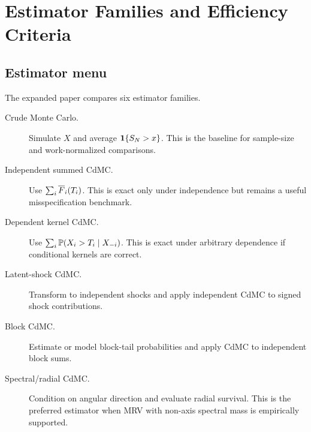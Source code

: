 \section{Estimator Families and Efficiency Criteria}
\label{sec:estimators-efficiency}

\subsection{Estimator menu}

The expanded paper compares six estimator families.

\begin{description}
\item[Crude Monte Carlo.] Simulate \(X\) and average \(\mathbf{1}\{S_N>x\}\). This is
the baseline for sample-size and work-normalized comparisons.

\item[Independent summed CdMC.] Use \(\sum_i\overline{F}_i(T_i)\). This is exact only
under independence but remains a useful misspecification benchmark.

\item[Dependent kernel CdMC.] Use \(\sum_i\mathbb{P}(X_i>T_i\mid X_{-i})\). This is
exact under arbitrary dependence if conditional kernels are correct.

\item[Latent-shock CdMC.] Transform to independent shocks and apply independent
CdMC to signed shock contributions.

\item[Block CdMC.] Estimate or model block-tail probabilities and apply CdMC to
independent block sums.

\item[Spectral/radial CdMC.] Condition on angular direction and evaluate radial
survival. This is the preferred estimator when MRV with non-axis spectral mass
is empirically supported.
\end{description}

\begin{table}[p]
\centering

\caption[Dependent estimator summary]{Dependent estimator summary. The table
specifies the conditioning object, required model input, exactness condition,
and planned efficiency diagnostic for each estimator family.}
\label{tab:dependent-estimator-summary}
\end{table}

